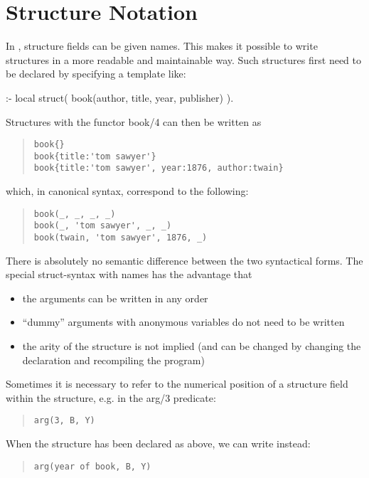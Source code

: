 \section{Structure Notation}
\label{structures}
In \eclipse, structure fields can be given names.
This makes it possible to write structures in a
more readable and maintainable way.
Such structures first need to be declared by specifying a template like:   
\begin{code}
:- local struct( book(author, title, year, publisher) ).
\end{code}
Structures with the functor book/4 can then be written as   
\begin{quote}\begin{verbatim}
book{}
book{title:'tom sawyer'}
book{title:'tom sawyer', year:1876, author:twain}
\end{verbatim}\end{quote}
which, in canonical syntax, correspond to the following:
\begin{quote}\begin{verbatim}
book(_, _, _, _)
book(_, 'tom sawyer', _, _)
book(twain, 'tom sawyer', 1876, _)
\end{verbatim}\end{quote}
There is absolutely no semantic difference between the two syntactical forms.
The special struct-syntax with names has the advantage that
\begin{itemize}
\item the arguments can be written in any order
\item ``dummy'' arguments with anonymous variables do not need to be written
\item the arity of the structure is not implied (and can be changed
by changing the declaration and recompiling the program)
\end{itemize}
Sometimes it is necessary to refer to the numerical position of a
structure field within the structure, e.g. in the arg/3 predicate:
\begin{quote}\begin{verbatim}
arg(3, B, Y)
\end{verbatim}\end{quote}
When the structure has been declared as above, we can write instead:
\begin{quote}\begin{verbatim}
arg(year of book, B, Y)
\end{verbatim}\end{quote}

